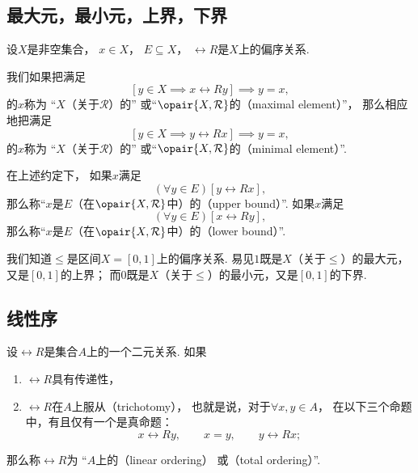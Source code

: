 \subsection{最大元，最小元，上界，下界}
\begin{definition}
设\(X\)是非空集合，
\(x \in X\)，
\(E \subseteq X\)，
\(\rel{R}\)是\(X\)上的偏序关系.

我们如果把满足\[
	[y \in X \implies x\rel{R}y]
	\implies
	y = x,
\]的\(x\)称为
“\(X\)（关于\(\mathcal{R}\)）的”
或“\(\opair{X,\mathcal{R}}\)的（maximal element）”，
那么相应地把满足\[
	[y \in X \implies y\rel{R}x]
	\implies
	y = x,
\]的\(x\)称为
“\(X\)（关于\(\mathcal{R}\)）的”
或“\(\opair{X,\mathcal{R}}\)的（minimal element）”.

在上述约定下，
如果\(x\)满足\[
	(\forall y \in E)[y\rel{R}x],
\]
那么称“\(x\)是\(E\)（在\(\opair{X,\mathcal{R}}\)中）的（upper bound）”.
如果\(x\)满足\[
	(\forall y \in E)[x\rel{R}y],
\]
那么称“\(x\)是\(E\)（在\(\opair{X,\mathcal{R}}\)中）的（lower bound）”.
\end{definition}

\begin{example}
我们知道\(\leq\)是区间\(X=[0,1]\)上的偏序关系.
易见\(1\)既是\(X\)（关于\(\leq\)）的最大元，又是\([0,1]\)的上界；
而\(0\)既是\(X\)（关于\(\leq\)）的最小元，又是\([0,1]\)的下界.
\end{example}

\subsection{线性序}
\begin{definition}
设\(\rel{R}\)是集合\(A\)上的一个二元关系.
如果\begin{enumerate}
	\item \(\rel{R}\)具有传递性，
	\item \(\rel{R}\)在\(A\)上服从（trichotomy），
	也就是说，对于\(\forall x,y \in A\)，
	在以下三个命题中，有且仅有一个是真命题：\[
		x \rel{R} y, \qquad
		x = y, \qquad
		y \rel{R} x;
	\]
\end{enumerate}
那么称\(\rel{R}\)为
“\(A\)上的（linear ordering）
或（total ordering）”.
\end{definition}

